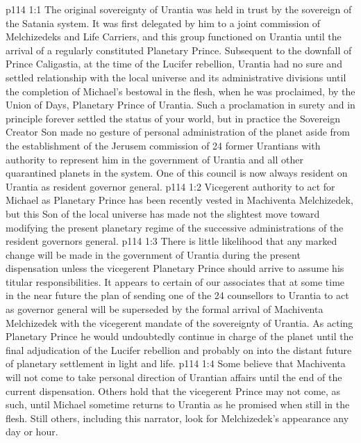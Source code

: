 \vs p114 1:1 The original sovereignty of Urantia was held in trust by the sovereign of the Satania system. It was first delegated by him to a joint commission of Melchizedeks and Life Carriers, and this group functioned on Urantia until the arrival of a regularly constituted Planetary Prince. Subsequent to the downfall of Prince Caligastia, at the time of the Lucifer rebellion, Urantia had no sure and settled relationship with the local universe and its administrative divisions until the completion of Michael’s bestowal in the flesh, when he was proclaimed, by the Union of Days, Planetary Prince of Urantia. Such a proclamation in surety and in principle forever settled the status of your world, but in practice the Sovereign Creator Son made no gesture of personal administration of the planet aside from the establishment of the Jerusem commission of 24 former Urantians with authority to represent him in the government of Urantia and all other quarantined planets in the system. One of this council is now always resident on Urantia as resident governor general.
\vs p114 1:2 Vicegerent authority to act for Michael as Planetary Prince has been recently vested in Machiventa Melchizedek, but this Son of the local universe has made not the slightest move toward modifying the present planetary regime of the successive administrations of the resident governors general.
\vs p114 1:3 There is little likelihood that any marked change will be made in the government of Urantia during the present dispensation unless the vicegerent Planetary Prince should arrive to assume his titular responsibilities. It appears to certain of our associates that at some time in the near future the plan of sending one of the 24 counsellors to Urantia to act as governor general will be superseded by the formal arrival of Machiventa Melchizedek with the vicegerent mandate of the sovereignty of Urantia. As acting Planetary Prince he would undoubtedly continue in charge of the planet until the final adjudication of the Lucifer rebellion and probably on into the distant future of planetary settlement in light and life.
\vs p114 1:4 Some believe that Machiventa will not come to take personal direction of Urantian affairs until the end of the current dispensation. Others hold that the vicegerent Prince may not come, as such, until Michael sometime returns to Urantia as he promised when still in the flesh. Still others, including this narrator, look for Melchizedek’s appearance any day or hour.
